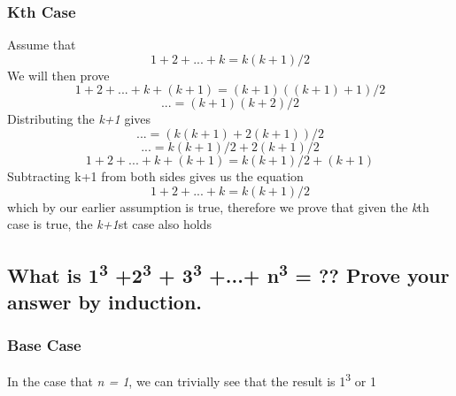 \documentclass[titlepage]{article}
\numberwithin{equation}{subsection}
\begin{document}
\subsubsection{Kth Case}
Assume that
\begin{equation}
    1 + 2 + ... + k = k(k + 1)/ 2
\end{equation}
We will then prove
\begin{equation}
    1 + 2 + ... + k + (k+1) = (k+1)((k+1)+1)/2
\end{equation}
\begin{equation}
    ... = (k+1)(k+2)/2
\end{equation}
Distributing the \textit{k+1} gives
\begin{equation}
    ... = (k(k+1) + 2(k+1))/2
\end{equation}
\begin{equation}
    ... = k(k+1)/2 + 2(k+1)/2
\end{equation}
\begin{equation}
    1 + 2 + ... + k + (k+1) = k(k+1)/2 + (k+1)
\end{equation}
Subtracting k+1 from both sides gives us the equation
\begin{equation}
    1 + 2 + ... + k = k(k+1)/2
\end{equation}
which by our earlier assumption is true, therefore we prove
that given the \textit{k}th case is true, the \textit{k+1}st case also holds

\subsection{What is 1\textsuperscript{3} +2\textsuperscript{3} + 3\textsuperscript{3} +...+ n\textsuperscript{3} = ?? Prove your answer by induction.}
\subsubsection{Base Case}
In the case that \textit{n = 1}, we can trivially see that the result is 1\textsuperscript{3} or 1
\end{document}
